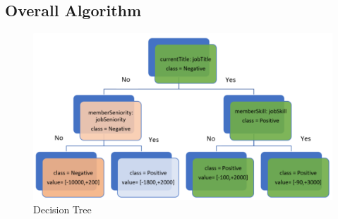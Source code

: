 \subsection{Overall Algorithm}
\begin{figure}
\centering
    \includegraphics[width=\textwidth]{decision-tree-final.png}
\caption{Decision Tree}
\label{fig:decision-tree}
\end{figure}
